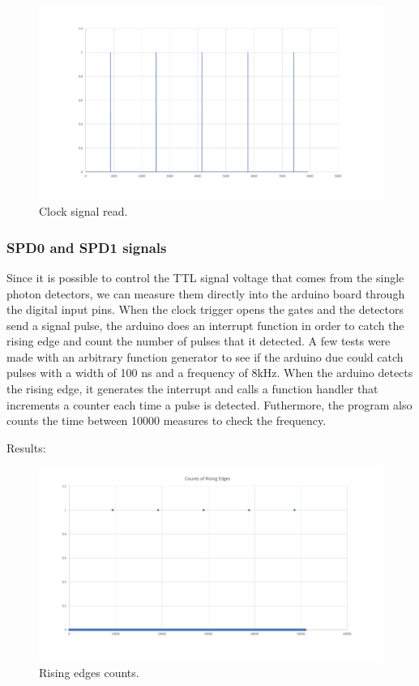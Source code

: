 \begin{refsection}
	\begin{figure}[H]
		\centering
		\includegraphics[width=1\linewidth]{./sdf/arduino_quantum_rx/figures/clockSignal2.pdf}
		\caption{Clock signal read.}
		\label{montage}
	\end{figure}

\subsubsection{SPD0 and SPD1 signals}

Since it is possible to control the TTL signal voltage that comes from the single photon detectors, we can measure them directly into the arduino board through the digital input pins. When the clock trigger opens the gates and the detectors send a signal pulse, the arduino does an interrupt function in order to catch the rising edge and count the number of pulses that it detected. 
A few tests were made with an arbitrary function generator to see if the arduino due could catch pulses with a width of 100 ns and a frequency of 8kHz. When the arduino detects the rising edge, it generates the interrupt and calls a function handler that increments a counter each time a pulse is detected. Futhermore, the program also counts the time between 10000 measures to check the frequency.

Results:
\begin{figure}[H]
	\centering
	\includegraphics[width=1\linewidth]{./sdf/arduino_quantum_rx/figures/Teste2.pdf}
	\caption{Rising edges counts.}
	\label{montage}
\end{figure}


\end{refsection}
